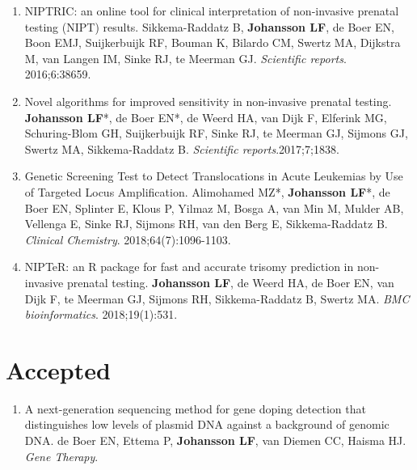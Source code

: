 \begin{appendices}
\begin{enumerate}
	\item NIPTRIC: an online tool for clinical interpretation of non-invasive prenatal testing (NIPT) results. Sikkema-Raddatz B, \textbf{Johansson LF}, de Boer EN, Boon EMJ, Suijkerbuijk RF, Bouman K, Bilardo CM, Swertz MA, Dijkstra M, van Langen IM, Sinke RJ, te Meerman GJ. \textsl{Scientific reports}. 2016;6:38659.
	\item Novel algorithms for improved sensitivity in non-invasive prenatal testing. \textbf{Johansson LF}*, de Boer EN*, de Weerd HA, van Dijk F, Elferink MG, Schuring-Blom GH, Suijkerbuijk RF, Sinke RJ, te Meerman GJ, Sijmons GJ, Swertz MA, Sikkema-Raddatz B. \textsl{Scientific reports}.2017;7;1838.
	\item Genetic Screening Test to Detect Translocations in Acute Leukemias by Use of Targeted Locus Amplification. Alimohamed MZ*, \textbf{Johansson LF}*, de Boer EN, Splinter E, Klous P, Yilmaz M, Bosga A, van Min M, Mulder AB, Vellenga E, Sinke RJ, Sijmons RH, van den Berg E, Sikkema-Raddatz B. \textsl{Clinical Chemistry}. 2018;64(7):1096-1103.
	\item NIPTeR: an R package for fast and accurate trisomy prediction in non-invasive prenatal testing. \textbf{Johansson LF}, de Weerd HA, de Boer EN, van Dijk F, te Meerman GJ, Sijmons RH, Sikkema-Raddatz B, Swertz MA. \textsl{BMC bioinformatics}. 2018;19(1):531.
	\end{enumerate}
	
	\section*{Accepted}
	\begin{enumerate}
		\item A next-generation sequencing method for gene doping detection that distinguishes low levels of plasmid DNA against a background of genomic DNA. de Boer EN, Ettema P, \textbf{Johansson LF}, van Diemen CC, Haisma HJ. \textsl{Gene Therapy}.
	\end{enumerate}
	

\end{appendices}
